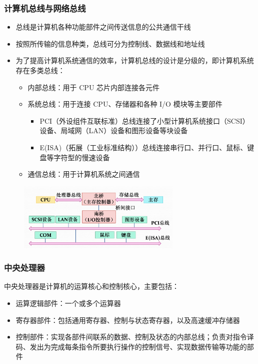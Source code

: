 \documentclass[cs4size,a4paper,10pt]{ctexart}
\begin{document}
	\subsubsection{计算机总线与网络总线}
	\begin{itemize}
		\item 总线是计算机各种功能部件之间传送信息的公共通信干线
		\item 按照所传输的信息种类，总线可分为控制线、数据线和地址线
		\item 为了提高计算机系统通信的效率，计算机总线的设计是分级的，即计算机系统存在多类总线：
		\begin{itemize}
			\item 内部总线：用于 CPU 芯片内部连接各元件
			\item 系统总线：用于连接 CPU、存储器和各种 I/O 模块等主要部件
			\begin{itemize}
				\item PCI（外设组件互联标准）总线连接了小型计算机系统接口（SCSI）设备、局域网（LAN）设备和图形设备等块设备
				\item E(ISA)（拓展（工业标准结构））总线连接串行口、并行口、鼠标、键盘等字符型的慢速设备
			\end{itemize}
			\item 通信总线：用于计算机系统之间通信
		\end{itemize}
	\end{itemize}
	\begin{figure}[H]
		\centering
		\includegraphics[width=0.7\textwidth]{img/1.1.2.3}
	\end{figure}


	\subsubsection{中央处理器}
	中央处理器是计算机的运算核心和控制核心，主要包括：
	\begin{itemize}
		\item 运算逻辑部件：一个或多个运算器
		\item 寄存器部件：包括通用寄存器、控制与状态寄存器，以及高速缓冲存储器
		\item 控制部件：实现各部件间联系的数据、控制及状态的内部总线；负责对指令译码、发出为完成每条指令所要执行操作的控制信号、实现数据传输等功能的部件
	\end{itemize}
\end{document}
